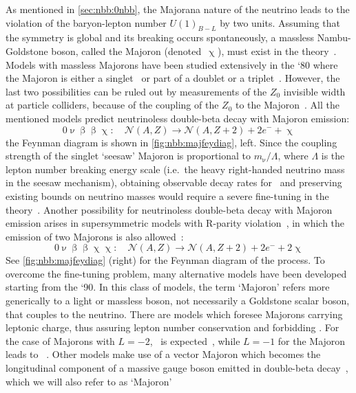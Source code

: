 As mentioned in \cref{sec:nbb:0nbb}, the Majorana nature of the neutrino leads
to the violation of the baryon-lepton number $U{(1)}_{B-L}$ by two units.
Assuming that the symmetry is global and its breaking occurs spontaneously, a
massless Nambu-Goldstone boson, called the Majoron (denoted~$\upchi$), must exist
in the theory~\cite{Chikashige1981, Schechter1982b, Gelmini1981, Georgi1981,
Mohpatra2004}.  Models with massless Majorons have been studied extensively in
the `80 where the Majoron is either a singlet~\cite{Chikashige1981} or part of
a doublet or a triplet~\cite{Gelmini1981, Georgi1981}. However, the last two
possibilities can be ruled out by measurements of the $Z_0$ invisible width at
particle colliders, because of the coupling of the $Z_0$ to the
Majoron~\cite{Berezhiani1992}. All the mentioned models predict neutrinoless
double-beta decay with Majoron emission:
\[
  0\upnu\upbeta\upbeta\upchi:\quad
    \mathcal{N}(A,Z) \longrightarrow \mathcal{N}(A,Z+2) + 2e^- + \upchi
\]
the Feynman diagram is shown in \cref{fig:nbb:majfeydiag}, left. Since the
coupling strength of the singlet `seesaw' Majoron is proportional to $m_{\upnu} /
\Lambda$, where $\Lambda$ is the lepton number breaking energy scale (i.e.~the
heavy right-handed neutrino mass in the seesaw mechanism), obtaining observable
decay rates for \onbbx\ and preserving existing bounds on neutrino masses would
require a severe fine-tuning in the theory~\cite{Burgess1993, Burgess1994}.
\newpar
Another possibility for neutrinoless double-beta decay with Majoron emission
arises in supersymmetric models with R-parity violation~\cite{Masiero1990,
Mohpatra2004}, in which the emission of two Majorons is also
allowed~\cite{Mohpatra1988}:
\[
  0\upnu\upbeta\upbeta\upchi\upchi:\quad
    \mathcal{N}(A,Z) \longrightarrow \mathcal{N}(A,Z+2) + 2e^- + 2\upchi
\]
See \cref{fig:nbb:majfeydiag} (right) for the Feynman diagram of the process.
\newpar
To overcome the fine-tuning problem, many alternative models have been
developed starting from the `90. In this class of models, the term `Majoron'
refers more generically to a light or massless boson, not necessarily a
Goldstone scalar boson, that couples to the neutrino. There are models which
foresee Majorons carrying leptonic charge, thus assuring lepton number
conservation and forbidding \onbb. For the case of Majorons with $L = −2$,
\onbbx\ is expected~\cite{Burgess1993}, while $L = −1$ for the Majoron leads to
\onbbxx~\cite{Burgess1994}. Other models make use of a vector Majoron which
becomes the longitudinal component of a massive gauge boson emitted in
double-beta decay~\cite{Carone1993}, which we will also refer to as `Majoron'
